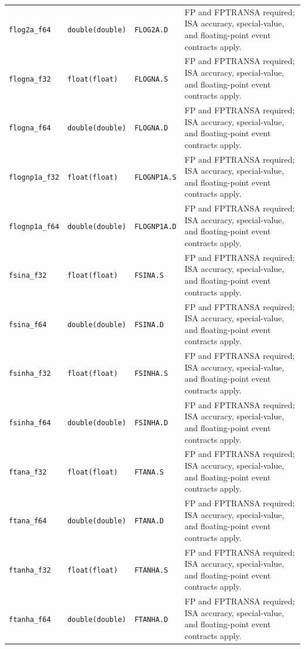 \begin{longtable}{@{}p{1.25in}p{1.3in}p{0.85in}p{2.2in}@{}}
\texttt{flog2a\_f64} & \texttt{double(double)} & \texttt{FLOG2A.D} & FP and FPTRANSA required; ISA accuracy, special-value, and floating-point event contracts apply.\\
\texttt{flogna\_f32} & \texttt{float(float)} & \texttt{FLOGNA.S} & FP and FPTRANSA required; ISA accuracy, special-value, and floating-point event contracts apply.\\
\texttt{flogna\_f64} & \texttt{double(double)} & \texttt{FLOGNA.D} & FP and FPTRANSA required; ISA accuracy, special-value, and floating-point event contracts apply.\\
\texttt{flognp1a\_f32} & \texttt{float(float)} & \texttt{FLOGNP1A.S} & FP and FPTRANSA required; ISA accuracy, special-value, and floating-point event contracts apply.\\
\texttt{flognp1a\_f64} & \texttt{double(double)} & \texttt{FLOGNP1A.D} & FP and FPTRANSA required; ISA accuracy, special-value, and floating-point event contracts apply.\\
\texttt{fsina\_f32} & \texttt{float(float)} & \texttt{FSINA.S} & FP and FPTRANSA required; ISA accuracy, special-value, and floating-point event contracts apply.\\
\texttt{fsina\_f64} & \texttt{double(double)} & \texttt{FSINA.D} & FP and FPTRANSA required; ISA accuracy, special-value, and floating-point event contracts apply.\\
\texttt{fsinha\_f32} & \texttt{float(float)} & \texttt{FSINHA.S} & FP and FPTRANSA required; ISA accuracy, special-value, and floating-point event contracts apply.\\
\texttt{fsinha\_f64} & \texttt{double(double)} & \texttt{FSINHA.D} & FP and FPTRANSA required; ISA accuracy, special-value, and floating-point event contracts apply.\\
\texttt{ftana\_f32} & \texttt{float(float)} & \texttt{FTANA.S} & FP and FPTRANSA required; ISA accuracy, special-value, and floating-point event contracts apply.\\
\texttt{ftana\_f64} & \texttt{double(double)} & \texttt{FTANA.D} & FP and FPTRANSA required; ISA accuracy, special-value, and floating-point event contracts apply.\\
\texttt{ftanha\_f32} & \texttt{float(float)} & \texttt{FTANHA.S} & FP and FPTRANSA required; ISA accuracy, special-value, and floating-point event contracts apply.\\
\texttt{ftanha\_f64} & \texttt{double(double)} & \texttt{FTANHA.D} & FP and FPTRANSA required; ISA accuracy, special-value, and floating-point event contracts apply.\\

\end{longtable}
